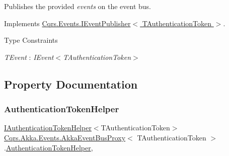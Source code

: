 Publishes the provided {\itshape events}  on the event bus. 



Implements \hyperlink{interfaceCqrs_1_1Events_1_1IEventPublisher_a2cbcc3d2c24d015abef6337714ec51ff}{Cqrs.\+Events.\+I\+Event\+Publisher$<$ T\+Authentication\+Token $>$}.

\begin{Desc}
\item[Type Constraints]\begin{description}
\item[{\em T\+Event} : {\em I\+Event$<$T\+Authentication\+Token$>$}]\end{description}
\end{Desc}


\subsection{Property Documentation}
\mbox{\label{classCqrs_1_1Akka_1_1Events_1_1AkkaEventBusProxy_a54964db320ef21b0564e66e9f258f694}} 
\subsubsection{\texorpdfstring{Authentication\+Token\+Helper}{AuthenticationTokenHelper}}
{\footnotesize\ttfamily \hyperlink{interfaceCqrs_1_1Authentication_1_1IAuthenticationTokenHelper}{I\+Authentication\+Token\+Helper}$<$T\+Authentication\+Token$>$ \hyperlink{classCqrs_1_1Akka_1_1Events_1_1AkkaEventBusProxy}{Cqrs.\+Akka.\+Events.\+Akka\+Event\+Bus\+Proxy}$<$ T\+Authentication\+Token $>$.\hyperlink{classCqrs_1_1Authentication_1_1AuthenticationTokenHelper}{Authentication\+Token\+Helper}\hspace{0.3cm}{\ttfamily [get]}, {\ttfamily [protected]}}

\mbox{\label{classCqrs_1_1Akka_1_1Events_1_1AkkaEventBusProxy_a4cc4ec0ece94393246b0c64f02d55f41}} 
